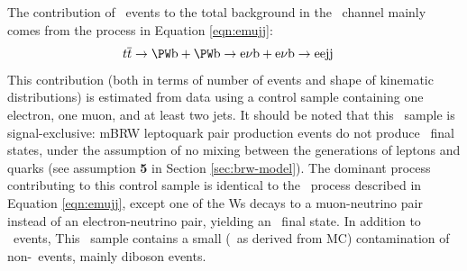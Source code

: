 The contribution of \ttbar~events to the total background in the \eejj~channel 
mainly comes from the process in Equation \ref{eqn:emujj}:
\begin{equation}
  \mbox{\ttbar} \rightarrow \mbox{\PW} \mbox{b} + \mbox{\PW} \mbox{b} \rightarrow \mbox{e} \nu \mbox{b} + \mbox{e} \nu \mbox{b} \rightarrow \mbox{eejj} \quad
  \label{eqn:emujj}
\end{equation} 
This contribution (both in terms of number of events and shape of kinematic distributions) 
is estimated from data using a control sample containing one electron, one muon, and at least two jets.
It should be noted that this \emujj~sample is signal-exclusive: mBRW leptoquark pair production events 
do not produce \emujj~final states, under the assumption of no mixing between 
the generations of leptons and quarks (see assumption {\bf 5} in Section \ref{sec:brw-model}).
The dominant process contributing to this control 
sample is identical to the \ttbar~process described in Equation \ref{eqn:emujj}, except
one of the Ws decays to a muon-neutrino pair instead of an electron-neutrino pair, yielding an \emujj~final state.
In addition to \ttbar~events, 
This \emujj~sample contains
a small (\ContaminationAtTTBARemujj~as derived from MC) contamination of non-\ttbar~events, mainly diboson events.

